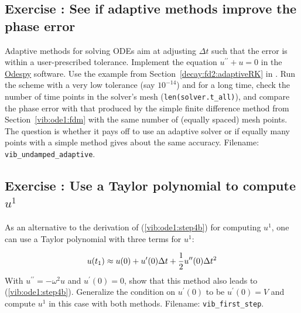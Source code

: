 \documentclass[%
oneside,                 %
final,                   %
10pt]{article}
\newenvironment{doconceexercise}{}{}
\newcounter{doconceexercisecounter}
\begin{document}
\begin{doconceexercise}

\subsection*{Exercise \thedoconceexercisecounter: See if adaptive methods improve the phase error}

\label{vib:exer:undamped:adaptive}

Adaptive methods for solving ODEs aim at adjusting $\Delta t$ such
that the error is within a user-prescribed tolerance. Implement the
equation $u^{\prime\prime}+u=0$ in the \href{{https://github.com/hplgit/odespy}}{Odespy}
software. Use the example from Section~\ref{decay:fd2:adaptiveRK} in \cite{Langtangen_decay}.  Run the scheme with a very low
tolerance (say $10^{-14}$) and for a long time, check the number of
time points in the solver's mesh (\Verb!len(solver.t_all)!), and compare
the phase error with that produced by the simple finite difference
method from Section~\ref{vib:ode1:fdm} with the same number of (equally
spaced) mesh points. The question is whether it pays off to use an
adaptive solver or if equally many points with a simple method gives
about the same accuracy.
\noindent Filename: \Verb!vib_undamped_adaptive!.

\end{doconceexercise}




\begin{doconceexercise}

\subsection*{Exercise \thedoconceexercisecounter: Use a Taylor polynomial to compute $u^1$}

\label{vib:exer:step4b:alt}

As an alternative to the derivation of (\ref{vib:ode1:step4b}) for
computing $u^1$, one can use a Taylor polynomial with three terms
for $u^1$:

\[ u(t_1) \approx u(0) + u^{\prime}(0)\Delta t + {\half}u^{\prime\prime}(0)\Delta t^2\]
With $u^{\prime\prime}=-\omega^2 u$ and $u^{\prime}(0)=0$, show that this method also leads to
(\ref{vib:ode1:step4b}). Generalize the condition on $u^{\prime}(0)$ to
be $u^{\prime}(0)=V$ and compute $u^1$ in this case with both methods.
\noindent Filename: \Verb!vib_first_step!.

\end{doconceexercise}
\end{document}
